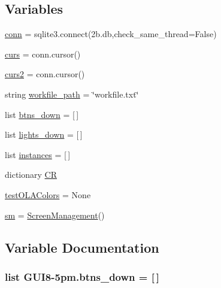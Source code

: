 \subsection*{Variables}
\begin{DoxyCompactItemize}
\item 
\hyperlink{namespaceGUI8-5pm_a754cc5d2663b1ceb611c13b8e4ec91ad}{conn} = sqlite3.\+connect(\textquotesingle{}2b.\+db\textquotesingle{},check\+\_\+same\+\_\+thread=\+False)
\item 
\hyperlink{namespaceGUI8-5pm_adfad6340169cdc0fa55a47953d6320a0}{curs} = conn.\+cursor()
\item 
\hyperlink{namespaceGUI8-5pm_acbb42dfb89c49147b15b0355fa744c45}{curs2} = conn.\+cursor()
\item 
string \hyperlink{namespaceGUI8-5pm_a508b4e6132ee7dc30a64d3138ca931f1}{workfile\+\_\+path} = \char`\"{}workfile.\+txt\char`\"{}
\item 
list \hyperlink{namespaceGUI8-5pm_a90613e2e5dbe99c084c15b8d8d7d83fa}{btns\+\_\+down} = \mbox{[}$\,$\mbox{]}
\item 
list \hyperlink{namespaceGUI8-5pm_a2d5665b7141552d71c310888d41efbd7}{lights\+\_\+down} = \mbox{[}$\,$\mbox{]}
\item 
list \hyperlink{namespaceGUI8-5pm_ac6f3b5abf90a01b9e7266f0ebbc1b5e8}{instances} = \mbox{[}$\,$\mbox{]}
\item 
dictionary \hyperlink{namespaceGUI8-5pm_a14d7ab1cf4721110f93f3f0b29286697}{CR}
\item 
\hyperlink{namespaceGUI8-5pm_ab68e1f0d94f4a00210276fed699faaf7}{test\+O\+L\+A\+Colors} = None
\item 
\hyperlink{namespaceGUI8-5pm_a6e831d571cc3bc2fd29a3c47972ede7d}{sm} = \hyperlink{classGUI8-5pm_1_1ScreenManagement}{Screen\+Management}()
\end{DoxyCompactItemize}


\subsection{Variable Documentation}
\subsubsection[{\texorpdfstring{btns\+\_\+down}{btns_down}}]{\setlength{\rightskip}{0pt plus 5cm}list G\+U\+I8-\/5pm.\+btns\+\_\+down = \mbox{[}$\,$\mbox{]}}\hypertarget{namespaceGUI8-5pm_a90613e2e5dbe99c084c15b8d8d7d83fa}{}\label{namespaceGUI8-5pm_a90613e2e5dbe99c084c15b8d8d7d83fa}
